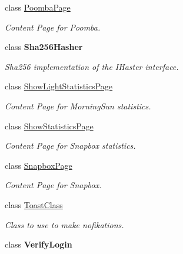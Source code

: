 \begin{DoxyCompactItemize}
class \mbox{\hyperlink{class_f_w_p_s___app_1_1_poomba_page}{Poomba\+Page}}
\begin{DoxyCompactList}\small\item\em Content Page for Poomba. \end{DoxyCompactList}\item 
class {\bfseries Sha256\+Hasher}
\begin{DoxyCompactList}\small\item\em Sha256 implementation of the I\+Haster interface. \end{DoxyCompactList}\item 
class \mbox{\hyperlink{class_f_w_p_s___app_1_1_show_light_statistics_page}{Show\+Light\+Statistics\+Page}}
\begin{DoxyCompactList}\small\item\em Content Page for Morning\+Sun statistics. \end{DoxyCompactList}\item 
class \mbox{\hyperlink{class_f_w_p_s___app_1_1_show_statistics_page}{Show\+Statistics\+Page}}
\begin{DoxyCompactList}\small\item\em Content Page for Snapbox statistics. \end{DoxyCompactList}\item 
class \mbox{\hyperlink{class_f_w_p_s___app_1_1_snapbox_page}{Snapbox\+Page}}
\begin{DoxyCompactList}\small\item\em Content Page for Snapbox. \end{DoxyCompactList}\item 
class \mbox{\hyperlink{class_f_w_p_s___app_1_1_toast_class}{Toast\+Class}}
\begin{DoxyCompactList}\small\item\em Class to use to make nofikations. \end{DoxyCompactList}\item 
class {\bfseries Verify\+Login}
\end{DoxyCompactItemize}
